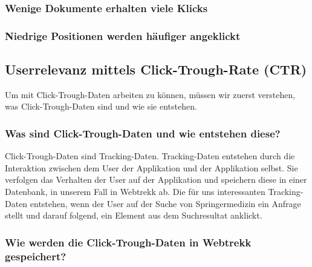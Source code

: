 \subsubsection{Wenige Dokumente erhalten viele Klicks}
\label{sec:Grundlagen:SemantikUserInteraktionen:DocumentAttraction}



\subsubsection{Niedrige Positionen werden häufiger angeklickt}
\label{sec:Grundlagen:SemantikUserInteraktionen:RankExamination}




\subsection{Userrelevanz mittels Click-Trough-Rate (CTR)}
\label{sec:Grundlagen:Click-Trough-Daten}

Um mit Click-Trough-Daten arbeiten zu können, müssen wir zuerst verstehen, was Click-Trough-Daten sind und wie sie entstehen. 

\subsubsection{Was sind Click-Trough-Daten und wie entstehen diese?}
\label{sec:Grundlagen:Grundbegriffe:Click-Trough-Daten:WasSindClick-Trough-Daten}

Click-Trough-Daten sind Tracking-Daten. Tracking-Daten entstehen durch die Interaktion zwischen dem User der Applikation und der Applikation selbst. Sie verfolgen das Verhalten der User auf der Applikation und speichern diese in einer Datenbank, in unserem Fall in Webtrekk ab. Die für uns interessanten Tracking-Daten entstehen, wenn der User auf der Suche von Springermedizin ein Anfrage stellt und darauf folgend, ein Element aus dem Suchresultat anklickt.

\subsubsection{Wie werden die Click-Trough-Daten in Webtrekk gespeichert?}
\label{sec:Grundlagen:Grundbegriffe:Click-Trough-Daten:SpeichernClick-Trough-Daten}

